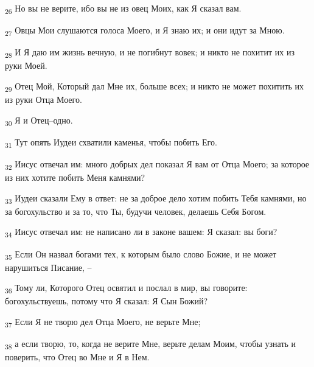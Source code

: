 \begin{tcolorbox}
\textsubscript{26} Но вы не верите, ибо вы не из овец Моих, как Я сказал вам.
\end{tcolorbox}
\begin{tcolorbox}
\textsubscript{27} Овцы Мои слушаются голоса Моего, и Я знаю их; и они идут за Мною.
\end{tcolorbox}
\begin{tcolorbox}
\textsubscript{28} И Я даю им жизнь вечную, и не погибнут вовек; и никто не похитит их из руки Моей.
\end{tcolorbox}
\begin{tcolorbox}
\textsubscript{29} Отец Мой, Который дал Мне их, больше всех; и никто не может похитить их из руки Отца Моего.
\end{tcolorbox}
\begin{tcolorbox}
\textsubscript{30} Я и Отец--одно.
\end{tcolorbox}
\begin{tcolorbox}
\textsubscript{31} Тут опять Иудеи схватили каменья, чтобы побить Его.
\end{tcolorbox}
\begin{tcolorbox}
\textsubscript{32} Иисус отвечал им: много добрых дел показал Я вам от Отца Моего; за которое из них хотите побить Меня камнями?
\end{tcolorbox}
\begin{tcolorbox}
\textsubscript{33} Иудеи сказали Ему в ответ: не за доброе дело хотим побить Тебя камнями, но за богохульство и за то, что Ты, будучи человек, делаешь Себя Богом.
\end{tcolorbox}
\begin{tcolorbox}
\textsubscript{34} Иисус отвечал им: не написано ли в законе вашем: Я сказал: вы боги?
\end{tcolorbox}
\begin{tcolorbox}
\textsubscript{35} Если Он назвал богами тех, к которым было слово Божие, и не может нарушиться Писание, --
\end{tcolorbox}
\begin{tcolorbox}
\textsubscript{36} Тому ли, Которого Отец освятил и послал в мир, вы говорите: богохульствуешь, потому что Я сказал: Я Сын Божий?
\end{tcolorbox}
\begin{tcolorbox}
\textsubscript{37} Если Я не творю дел Отца Моего, не верьте Мне;
\end{tcolorbox}
\begin{tcolorbox}
\textsubscript{38} а если творю, то, когда не верите Мне, верьте делам Моим, чтобы узнать и поверить, что Отец во Мне и Я в Нем.
\end{tcolorbox}

